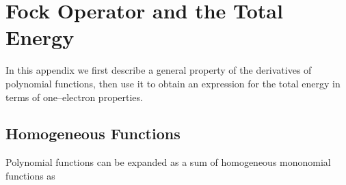 \documentclass[aps,preprint]{revtex4}%
\begin{document}
\section{Fock Operator and the Total Energy\label{Fock&Energy}}

In this appendix we first describe a general property of the derivatives of
polynomial functions, then use it to obtain an expression for the total energy
in terms of one--electron properties.

\subsection{Homogeneous Functions\label{HomFunc}}

Polynomial functions can be expanded as a sum of homogeneous mononomial
functions as%
\end{document}

